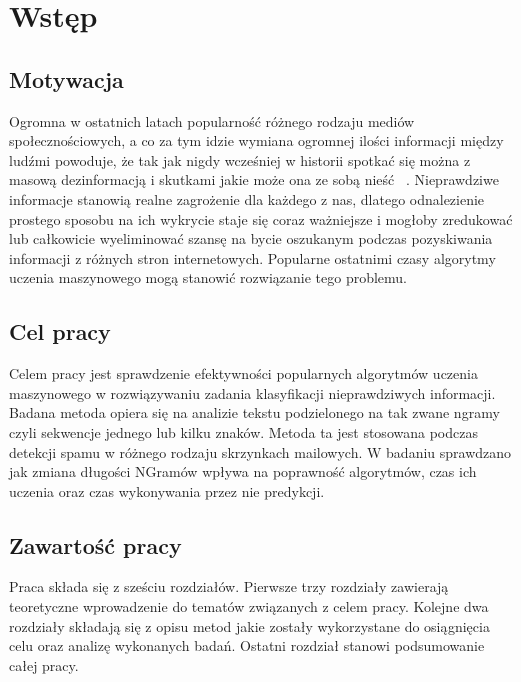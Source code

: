 \chapter*{Wstęp}
\section*{Motywacja}
Ogromna w ostatnich latach popularność różnego rodzaju mediów społecznościowych, a co za tym 
idzie wymiana ogromnej ilości informacji między ludźmi powoduje, że tak jak nigdy wcześniej 
w historii spotkać się można z masową dezinformacją i skutkami jakie może ona ze sobą nieść ~\cite{fakenewsreach}.
Nieprawdziwe informacje stanowią realne zagrożenie dla każdego z nas, dlatego odnalezienie 
prostego sposobu na ich wykrycie staje się coraz ważniejsze i mogłoby 
zredukować lub całkowicie wyeliminować szansę na bycie oszukanym podczas pozyskiwania
informacji z różnych stron internetowych. Popularne ostatnimi czasy algorytmy uczenia 
maszynowego mogą stanowić rozwiązanie tego problemu.
\section*{Cel pracy}
Celem pracy jest sprawdzenie efektywności popularnych algorytmów uczenia maszynowego w rozwiązywaniu 
zadania klasyfikacji nieprawdziwych informacji. Badana metoda opiera 
się na analizie tekstu podzielonego na tak zwane ngramy czyli sekwencje jednego lub kilku znaków.
Metoda ta jest stosowana podczas detekcji spamu w różnego rodzaju skrzynkach mailowych.
W badaniu sprawdzano jak zmiana długości NGramów wpływa na poprawność algorytmów, czas ich 
uczenia oraz czas wykonywania przez nie predykcji. 
\section*{Zawartość pracy}
Praca składa się z sześciu rozdziałów. Pierwsze trzy rozdziały zawierają teoretyczne wprowadzenie 
do tematów związanych z celem pracy. Kolejne dwa rozdziały składają się z opisu metod jakie 
zostały wykorzystane do osiągnięcia celu oraz analizę wykonanych badań. Ostatni rozdział 
stanowi podsumowanie całej pracy.

